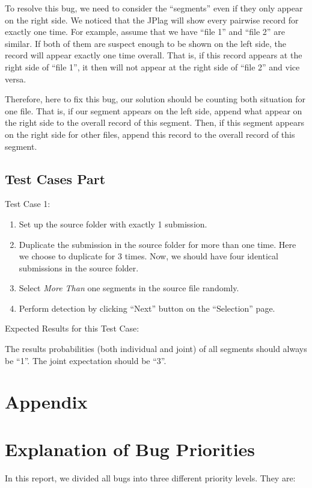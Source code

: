 \documentclass[twoside,a4paper]{refart}
\begin{document}
To resolve this bug, we need to consider the \enquote{segments} even if they only appear on the right side. We noticed that the JPlag will show every pairwise record for exactly one time. For example, assume that we have \enquote{file 1} and \enquote{file 2} are similar. If both of them are suspect enough to be shown on the left side, the record will appear exactly one time overall. That is, if this record appears at the right side of \enquote{file 1}, it then will not appear at the right side of \enquote{file 2} and vice versa.

Therefore, here to fix this bug, our solution should be counting both situation for one file. That is, if our segment appears on the left side, append what appear on the right side to the overall record of this segment. Then, if this segment appears on the right side for other files, append this record to the overall record of this segment.

\subsection{Test Cases Part}
Test Case 1:

\begin{enumerate}
\item Set up the source folder with exactly 1 submission. 
\item Duplicate the submission in the source folder for more than one time. Here we choose to duplicate for 3 times. Now, we should have four identical submissions in the source folder.
\item Select \emph{More Than} one segments in the source file randomly.
\item Perform detection by clicking \enquote{Next} button on the \enquote{Selection} page.
\end{enumerate}
Expected Results for this Test Case: 

The results probabilities (both individual and joint) of all segments should always be \enquote{1}. The joint expectation should be \enquote{3}.

\clearpage

\section*{Appendix}

\appendix

\section{Explanation of Bug Priorities}
In this report, we divided all bugs into three different priority levels. They are:
\end{document}
